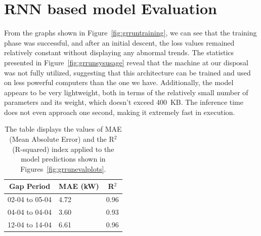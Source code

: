 
\section{RNN based model Evaluation}\label{sec:rnneval}
From the graphs shown in Figure~\ref{fig:grruntraining},
we can see that the training phase was successful,
and after an initial descent, the loss values remained relatively
constant without displaying any abnormal trends.
The statistics presented in Figure~\ref{fig:grrunsysusage} reveal
that the machine at our disposal was not fully utilized,
suggesting that this architecture can be trained and used on
less powerful computers than the one we have.
Additionally, the model appears to be very lightweight, both in terms
of the relatively small number of parameters and its weight,
which doesn't exceed 400~KB. The inference time does not even
approach one second, making it extremely fast in execution.

\begin{table}[H]
	\begin{center}
		\begin{tabular}[c]{l|l|l}
			\multicolumn{1}{c|}{\textbf{Gap Period}} &
			\multicolumn{1}{c|}{\textbf{MAE (kW)}}   &
			\multicolumn{1}{c}{\textbf{R}$^2$}                     \\
			\hline

			02-04 to 05-04                           & 4.72 & 0.96 \\
			04-04 to 04-04                           & 3.60 & 0.93 \\
			12-04 to 14-04                           & 6.61 & 0.96
		\end{tabular}
	\end{center}
	\caption{The table displays the values of MAE (Mean Absolute Error) and the R$^2$ (R-squared) index applied to the model predictions shown in Figures~\ref{fig:grrunevalplots}.}\label{tab:grrunpmaer}
\end{table}

